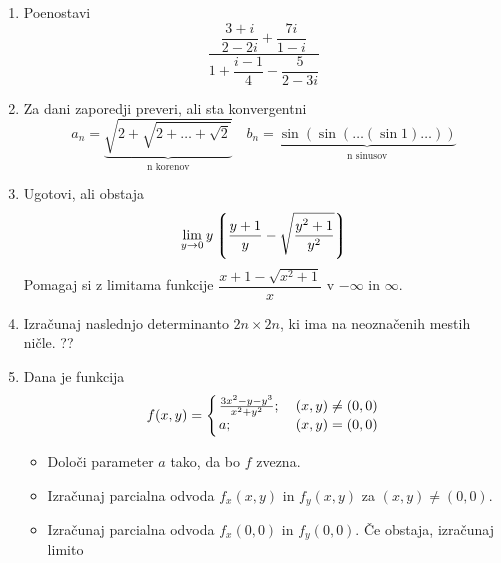 \documentclass[a4paper,12pt]{article}
\newcommand{\brfrac}[2]{\genfrac{}{}{0pt}{}{#1}{#2}}
\begin{document}
\begin{enumerate}
\item Poenostavi
\[ \dfrac{\dfrac{3 + i}{2 - 2i} + \dfrac{7i}{1 - i}}{1 + \dfrac{i - 1}{4} - \dfrac{5}{2 - 3i}}          \]

\item Za dani zaporedji preveri, ali sta konvergentni
\[a_n = \underbrace{ \sqrt{2 + \sqrt{2 + \dots + \sqrt{2}}}}_{\text{n korenov}} \quad b_n = \underbrace{\sin(\sin(\dots(\sin 1)\dots))}_{\text{n sinusov}}       \]

\item Ugotovi, ali obstaja
$$\lim_{y \to 0}y \left \lgroup \dfrac{y + 1 }{y} - \sqrt{\dfrac{y^2 + 1}{y^2}} \right \rgroup $$
Pomagaj si z limitama funkcije $\dfrac{x + 1 - \sqrt{x^2 + 1}}{x}$ v $-\infty$ in $\infty$.

\item Izračunaj naslednjo determinanto $2n \times 2n$, ki ima na neoznačenih mestih ničle.
??

\item Dana je funkcija
\[ f(x,y)=  \Bigg \{ \brfrac{\frac{3x^2 - y - y^3}{x^2 + y^2};}{ a;\hfill}\quad  \brfrac{(x,y) \neq (0,0)}{(x,y)=(0,0)}          \]
\begin{itemize}
    \item Določi parameter $a$ tako, da bo $f$ zvezna.
    \item Izračunaj parcialna odvoda $f_{x}(x,y)$ in $f_{y}(x,y)$ za $(x,y) \neq (0,0)$.
    \item Izračunaj parcialna odvoda $f_{x}(0,0)$ in $f_{y}(0,0)$. Če obstaja, izračunaj limito


\end{itemize}
\end{enumerate}
\end{document}
